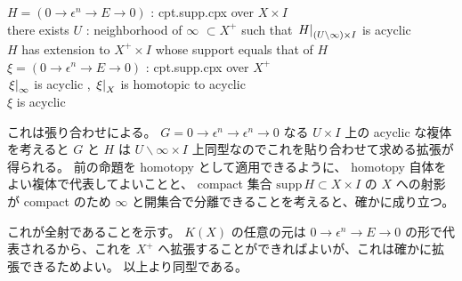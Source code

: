 \documentclass[dvipdfmx]{jsarticle}
\begin{document}
\begin{Theorem}
\itemprop
  \For \(H = (0 \to \epsilon^n \to E \to 0)\) : cpt.supp.cpx over \(X \times I\) \\
  \IfHold there exists \(U\) : neighborhood of \(\infty\) \(\subset X^+\) such that \(\left. {H} \right| _{(U \backslash \infty) \times I}\) is acyclic \\
  \Then \(H\) has extension to \(X^+ \times I\) whose support equals that of \(H\)
\itemprop
  \For \(\xi = (0 \to \epsilon^n \to E \to 0)\) : cpt.supp.cpx over \(X^+\) \\
  \IfHold \(\left. {\xi} \right| _{\infty}\) is acyclic , \(\left. {\xi} \right| _{X}\) is homotopic to acyclic \\
  \Then \(\xi\) is acyclic
\end{Theorem}

\begin{Proof}
\itemprof
  これは張り合わせによる。
  \(G = 0 \to \epsilon^n \to \epsilon^n \to 0\) なる \(U \times I\) 上の acyclic な複体を考えると \(G\) と \(H\) は \(U \backslash \infty \times I\) 上同型なのでこれを貼り合わせて求める拡張が得られる。
\itemprof
  前の命題を homotopy として適用できるように、 homotopy 自体をよい複体で代表してよいことと、 compact 集合 \(\text{supp} \, H \subset X \times I\) の \(X\) への射影が compact のため \(\infty\) と開集合で分離できることを考えると、確かに成り立つ。
\end{Proof}

これが全射であることを示す。
\(K(X)\) の任意の元は \(0 \to \epsilon^n \to E \to 0\) の形で代表されるから、これを \(X^+\) へ拡張することができればよいが、これは確かに拡張できるためよい。
以上より同型である。
\end{document}
